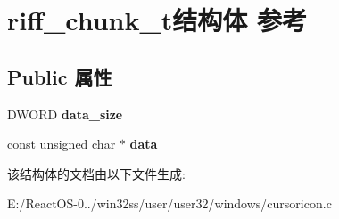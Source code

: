 \hypertarget{structriff__chunk__t}{}\section{riff\+\_\+chunk\+\_\+t结构体 参考}
\label{structriff__chunk__t}
\subsection*{Public 属性}
\begin{DoxyCompactItemize}
\item 
\mbox{\label{structriff__chunk__t_af189a69225ea4bbf82eec4a04d81f238}} 
D\+W\+O\+RD {\bfseries data\+\_\+size}
\item 
\mbox{\label{structriff__chunk__t_a19cb393f86b926e45cac59ea15865ea6}} 
const unsigned char $\ast$ {\bfseries data}
\end{DoxyCompactItemize}


该结构体的文档由以下文件生成\+:\begin{DoxyCompactItemize}
\item 
E\+:/\+React\+O\+S-\/0../win32ss/user/user32/windows/cursoricon.\+c\end{DoxyCompactItemize}

